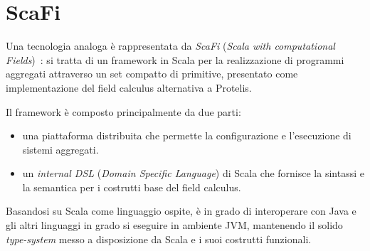 
\section{ScaFi}\label{sec:scafi}

Una tecnologia analoga è rappresentata da \emph{ScaFi} (\emph{\emph{Sca}la with computational \emph{Fi}elds})~\cite{aggregatescala-pmldc2016}:
si tratta di un framework in Scala per la realizzazione di programmi aggregati attraverso un set compatto di primitive, presentato come implementazione del field calculus alternativa a Protelis.

Il framework è composto principalmente da due parti:

\begin{itemize}
  \item una piattaforma distribuita che permette la configurazione e l'esecuzione di sistemi aggregati.
  \item un \emph{internal DSL} (\emph{Domain Specific Language}) di Scala che fornisce la sintassi e la semantica per i costrutti base del field calculus.
\end{itemize}

Basandosi su Scala come linguaggio ospite, è in grado di interoperare con Java e gli altri linguaggi in grado si eseguire in ambiente JVM, mantenendo il solido \emph{type-system} messo a disposizione da Scala e i suoi costrutti funzionali.

